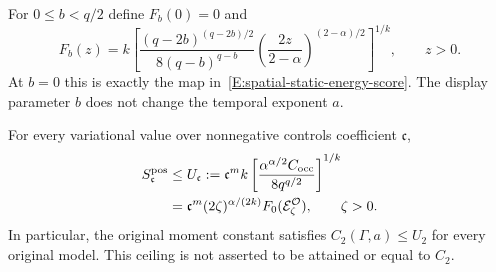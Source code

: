 For $0 \le b < q/2$ define $F_b(0) = 0$ and
\begin{equation}\label{E:occupation-scalar-map}
  F_b(z)=k\left[
  \frac{(q-2b)^{(q-2b)/2}}{8(q-b)^{q-b}}
  \left(\frac{2z}{2-\alpha}\right)^{(2-\alpha)/2}
  \right]^{1/k},\qquad z>0.
\end{equation}
At $b = 0$ this is exactly the map in~\eqref{E:spatial-static-energy-score}. The
display parameter $b$ does not change the temporal exponent $a$.

\begin{theorem}\label{T:intrinsic-occupation-ceiling}
  For every variational value over nonnegative controls coefficient
  $\mathfrak{c}$,
  \begin{align}
    S_{\mathfrak{c}}^{\mathrm{pos}}
    &\le U_{\mathfrak{c}}
    :=\mathfrak{c}^m k
    \left[\frac{\alpha^{\alpha/2}C_{\rm occ}}{8q^{q/2}}\right]^{1/k}
    \label{E:occupation-score-ceiling}\\
    &=\mathfrak{c}^m(2\zeta)^{\alpha/(2k)}
    F_0(\mathcal{E}_\zeta^{\mathcal{O}}),\qquad \zeta>0.\notag
  \end{align}
  In particular, the original moment constant satisfies $C_2(\Gamma,a) \le U_2$
  for every original model. This ceiling is not asserted to be attained or equal
  to $C_2$.
\end{theorem}

